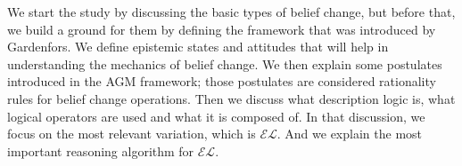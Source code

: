 We start the study by discussing the basic types of belief change, but before that, we build a ground for them by defining the framework that was introduced by Gardenfors. We define epistemic states and attitudes that will help in understanding the mechanics of belief change. We then explain some postulates introduced in the AGM framework; those postulates are considered rationality rules for belief change operations. Then we discuss what description logic is, what logical operators are used and what it is composed of. In that discussion, we focus on the most relevant variation, which is $\mathcal{EL}$. And we explain the most important reasoning algorithm for $\mathcal{EL}$.